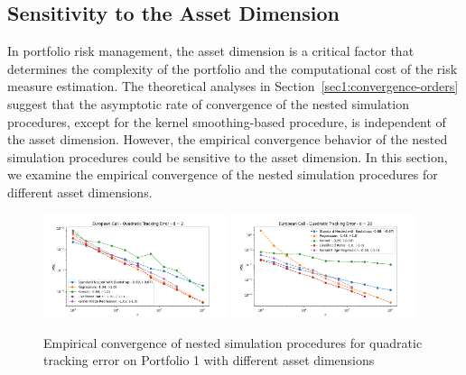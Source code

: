 \subsection{Sensitivity to the Asset Dimension} \label{sec1:sensitivity-dimension}
In portfolio risk management, the asset dimension is a critical factor that determines the complexity of the portfolio and the computational cost of the risk measure estimation.
The theoretical analyses in Section~\ref{sec1:convergence-orders} suggest that the asymptotic rate of convergence of the nested simulation procedures, except for the kernel smoothing-based procedure, is independent of the asset dimension.
However, the empirical convergence behavior of the nested simulation procedures could be sensitive to the asset dimension.
In this section, we examine the empirical convergence of the nested simulation procedures for different asset dimensions.

\begin{figure}[ht!]
    \centering
    \includegraphics[width=0.48\textwidth]{./project1/figures/figure2a.png}
    \includegraphics[width=0.48\textwidth]{./project1/figures/figure2b.png}
    \caption{Empirical convergence of nested simulation procedures for quadratic tracking error on Portfolio 1 with different asset dimensions}
    \label{fig1:assetDimension} 
\end{figure}

